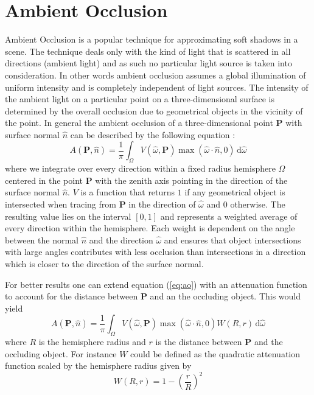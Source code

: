 \section{Ambient Occlusion}

Ambient Occlusion is a popular technique for approximating soft
shadows in a scene. The technique deals only with the kind of light
that is scattered in all directions (ambient light) and as such no
particular light source is taken into consideration. In other words
ambient occlusion assumes a global illumination of uniform intensity
and is completely independent of light sources.
The intensity of the ambient light on a particular point on a
three-dimensional surface is determined by the overall occlusion due
to geometrical objects in the vicinity of the point. In general the
ambient occlusion of a three-dimensional point $\mathbf{P}$ with
surface normal $\hat{n}$ can be described by the following equation
\citep{shanmugam}:
\begin{equation}
  \label{eq:ao}
  A(\mathbf{P},\hat{n}) = \frac{1}{\pi} \int_\Omega V(\hat{\omega},\mathbf{P})\max(\hat{\omega}\cdot\hat{n},0)\,\mathrm{d}\hat{\omega}
\end{equation}
where we integrate over every direction within a fixed radius
hemisphere $\Omega$ centered in the point $\mathbf{P}$ with the zenith
axis pointing in the direction of the surface normal $\hat{n}$. $V$ is
a function that returns $1$ if any geometrical object is intersected
when tracing from $\mathbf{P}$ in the direction of $\hat{\omega}$ and
$0$ otherwise. The resulting value lies on the interval $[0,1]$ and
represents a weighted average of every direction within the
hemisphere. Each weight is dependent on the angle between the normal
$\hat{n}$ and the direction $\hat{\omega}$ and ensures that object
intersections with large angles contributes with less occlusion than
intersections in a direction which is closer to the direction of the
surface normal.

For better results one can extend equation (\ref{eq:ao}) with an
attenuation function to account for the distance between $\mathbf{P}$
and an the occluding object. This would yield
\begin{equation}
  \label{eq:ao_att}
  A(\mathbf{P},\hat{n}) = \frac{1}{\pi} \int_\Omega
  V(\hat{\omega},\mathbf{P})\max(\hat{\omega}\cdot\hat{n},0)W(R,r) \,\mathrm{d}\hat{\omega}
\end{equation}
where $R$ is the hemisphere radius and $r$ is the distance between
$\mathbf{P}$ and the occluding object. For instance $W$ could be
defined as the quadratic attenuation function scaled by the hemisphere
radius given by
\begin{equation}
  \label{eq:quad_att}
  W(R,r) = 1-\left(\frac{r}{R}\right)^2
\end{equation}

